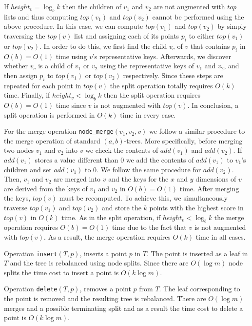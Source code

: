 \documentclass{llncs}
\begin{document}
If $height_v = \log_{b}{k}$ then the children of $v_1$ and $v_2$ are not augmented with $top$ lists and thus computing $top(v_1)$ and $top(v_2)$ cannot be performed using the above procedure. In this case, we can compute $top(v_1)$ and $top(v_2)$ by simply traversing the $top(v)$ list and assigning each of its points $p_i$ to either $top(v_1)$ or $top(v_2)$. In order to do this, we first find the child $v_c$ of $v$ that contains $p_i$ in $O(b)=O(1)$ time using $v$'s representative keys. Afterwards, we discover whether $v_c$ is a child of $v_1$ or $v_2$ using the representative keys of $v_1$ and $v_2$, and then assign $p_i$ to $top(v_1)$ or $top(v_2)$ respectively. Since these steps are repeated for each point in $top(v)$ the split operation totally requires $O(k)$ time. Finally, if $height_v < \log_{b}{k}$ then the split operation requires $O(b)=O(1)$ time since $v$ is not augmented with $top(v)$. In conclusion, a split operation is performed in $O(k)$ time in every case.



For the merge operation \texttt{node\_merge$(v_1,v_2,v)$} we follow a similar procedure to the merge operation of standard $(a,b)$-trees. More specifically, before merging two nodes $v_1$ and $v_2$ into $v$ we check the contents of $add(v_1)$ and $add(v_2)$. If $add(v_1)$ stores a value different than $0$ we add the contents of $add(v_1)$ to $v_1$'s children and set $add(v_1)$ to $0$. We follow the same procedure for $add(v_2)$. Then, $v_1$ and $v_2$ are merged into $v$ and the keys for the $x$ and $y$ dimensions of $v$ are derived from the keys of $v_1$ and $v_2$ in $O(b)=O(1)$ time. After merging the keys, $top(v)$ must be recomputed. To achieve this, we simultaneously traverse $top(v_1)$ and $top(v_2)$ and store the $k$ points with the highest score in $top(v)$ in $O(k)$ time.
As in the split operation, if $height_v < \log_{b}{k}$ the merge operation requires $O(b)=O(1)$ time due to the fact that $v$ is not augmented with $top(v)$. As a result, the merge operation requires $O(k)$ time in all cases.

Operation \texttt{insert$(T,p)$}, inserts a point $p$ in $T$. The point is inserted as a leaf in $T$ and the tree is rebalanced using node splits. Since there are $O(\log{m})$ node splits the time cost to insert a point is $O(k\log{m})$.

Operation \texttt{delete$(T,p)$}, removes a point $p$ from $T$. The leaf corresponding to the point is removed and the resulting tree is rebalanced. There are $O(\log m)$ merges and a possible terminating split and as a result the time cost to delete a point is $O(k\log{m})$.
\end{document}
